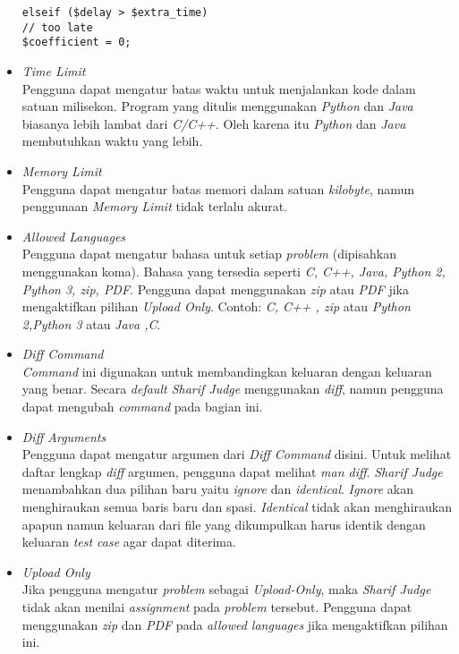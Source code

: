\begin{itemize}
\begin{lstlisting}[basicstyle=\ttfamily, frame=single,
columns=fullflexible, keepspaces=true, breaklines=true]
elseif ($delay > $extra_time)
// too late
$coefficient = 0;
\end{lstlisting}
	
	\item \textit{Time Limit} \\
	Pengguna dapat mengatur batas waktu untuk menjalankan kode dalam satuan milisekon. Program yang ditulis menggunakan \textit{Python} dan \textit{Java} biasanya lebih lambat dari \textit{C/C++}.	Oleh karena itu \textit{Python} dan \textit{Java} membutuhkan waktu yang lebih.
	
	\item \textit{Memory Limit} \\
	Pengguna dapat mengatur batas memori dalam satuan \textit{kilobyte}, namun penggunaan \textit{Memory Limit} tidak terlalu akurat.
	
	\item \textit{Allowed Languages} \\
	Pengguna dapat mengatur bahasa untuk setiap \textit{problem} (dipisahkan menggunakan koma). Bahasa yang tersedia seperti \textit{C, C++, Java, Python 2, Python 3, zip, PDF}. Pengguna dapat menggunakan \textit{zip} atau \textit{PDF} jika mengaktifkan pilihan \textit{Upload Only}. Contoh: \textit{C, C++ , zip} atau \textit{Python 2,Python 3} atau \textit{Java ,C}.
	
	\item \textit{Diff Command} \\
	\textit{Command} ini digunakan untuk membandingkan keluaran dengan keluaran yang benar. Secara \textit{default Sharif Judge} menggunakan \textit{diff}, namun pengguna dapat mengubah \textit{command} pada bagian ini.
	
	\item \textit{Diff Arguments} \\
	Pengguna dapat mengatur argumen dari \textit{Diff Command} disini. Untuk melihat daftar lengkap \textit{diff} argumen, pengguna dapat melihat \textit{man diff}. \textit{Sharif Judge} menambahkan dua pilihan baru yaitu \textit{ignore} dan \textit{identical}. \textit{Ignore} akan menghiraukan semua baris baru dan spasi. \textit{Identical} tidak akan menghiraukan apapun namun keluaran dari file yang dikumpulkan harus identik dengan keluaran \textit{test case} agar dapat diterima.
	
	\item \textit{Upload Only} \\
	Jika pengguna mengatur \textit{problem} sebagai \textit{Upload-Only}, maka \textit{Sharif Judge} tidak akan menilai \textit{assignment} pada \textit{problem} tersebut. Pengguna dapat menggunakan \textit{zip} dan \textit{PDF} pada \textit{allowed languages} jika mengaktifkan pilihan ini.
\end{itemize}

